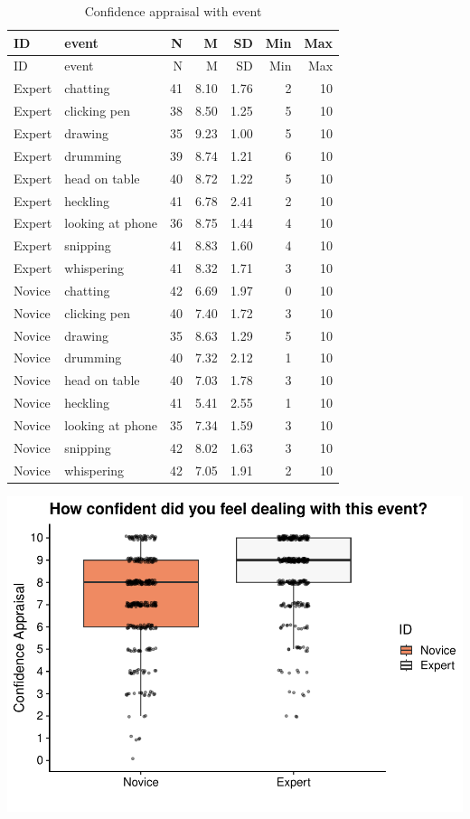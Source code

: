 \documentclass[
]{article}
\begin{document}
\begin{longtable}[]{@{}llrrrrr@{}}
\caption{Confidence appraisal with event}\tabularnewline
\toprule\noalign{}
ID & event & N & M & SD & Min & Max \\
\midrule\noalign{}
\endfirsthead
\toprule\noalign{}
ID & event & N & M & SD & Min & Max \\
\midrule\noalign{}
\endhead
\bottomrule\noalign{}
\endlastfoot
Expert & chatting & 41 & 8.10 & 1.76 & 2 & 10 \\
Expert & clicking pen & 38 & 8.50 & 1.25 & 5 & 10 \\
Expert & drawing & 35 & 9.23 & 1.00 & 5 & 10 \\
Expert & drumming & 39 & 8.74 & 1.21 & 6 & 10 \\
Expert & head on table & 40 & 8.72 & 1.22 & 5 & 10 \\
Expert & heckling & 41 & 6.78 & 2.41 & 2 & 10 \\
Expert & looking at phone & 36 & 8.75 & 1.44 & 4 & 10 \\
Expert & snipping & 41 & 8.83 & 1.60 & 4 & 10 \\
Expert & whispering & 41 & 8.32 & 1.71 & 3 & 10 \\
Novice & chatting & 42 & 6.69 & 1.97 & 0 & 10 \\
Novice & clicking pen & 40 & 7.40 & 1.72 & 3 & 10 \\
Novice & drawing & 35 & 8.63 & 1.29 & 5 & 10 \\
Novice & drumming & 40 & 7.32 & 2.12 & 1 & 10 \\
Novice & head on table & 40 & 7.03 & 1.78 & 3 & 10 \\
Novice & heckling & 41 & 5.41 & 2.55 & 1 & 10 \\
Novice & looking at phone & 35 & 7.34 & 1.59 & 3 & 10 \\
Novice & snipping & 42 & 8.02 & 1.63 & 3 & 10 \\
Novice & whispering & 42 & 7.05 & 1.91 & 2 & 10 \\
\end{longtable}

\includegraphics{expertise_2024_09_26_no_outlierdetection_MK_files/figure-latex/sri_ca-1.pdf}
\end{document}
